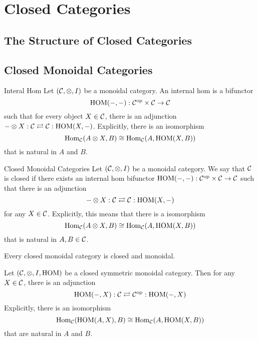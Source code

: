 \documentclass[a4paper]{article}
\begin{document}
\section{Closed Categories}
\subsection{The Structure of Closed Categories}

\subsection{Closed Monoidal Categories}
\begin{defn}{Interal Hom}{} Let $(\mathcal{C},\otimes,I)$ be a monoidal category. An internal hom is a bifunctor $$\text{HOM}(-,-):\mathcal{C}^\text{op}\times\mathcal{C}\to\mathcal{C}$$ such that for every object $X\in\mathcal{C}$, there is an adjunction $-\otimes X:\mathcal{C}\rightleftarrows\mathcal{C}:\text{HOM}(X,-)$. Explicitly, there is an isomorphism $$\operatorname{Hom}_{\mathcal{C}}(A\otimes X,B)\cong\operatorname{Hom}_{\mathcal{C}}(A,\text{HOM}(X,B))$$ that is natural in $A$ and $B$. 
\end{defn}

\begin{defn}{Closed Monoidal Categories}{} Let $(\mathcal{C},\otimes,I)$ be a monoidal category. We say that $\mathcal{C}$ is closed if there exists an internal hom bifunctor $\text{HOM}(-,-):\mathcal{C}^\text{op}\times\mathcal{C}\to\mathcal{C}$ such that there is an adjunction $$-\otimes X:\mathcal{C}\rightleftarrows\mathcal{C}:\text{HOM}(X,-)$$ for any $X\in\mathcal{C}$. Explicitly, this means that there is a isomorphism $$\operatorname{Hom}_{\mathcal{C}}(A\otimes X,B)\cong\operatorname{Hom}_{\mathcal{C}}(A,\text{HOM}(X,B))$$ that is natural in $A,B\in\mathcal{C}$. 
\end{defn}

\begin{prp}{}{} Every closed monoidal category is closed and monoidal. 
\end{prp}

\begin{prp}{}{} Let $(\mathcal{C},\otimes,I,\text{HOM})$ be a closed symmetric monoidal category. Then for any $X\in\mathcal{C}$, there is an adjunction $$\text{HOM}(-,X):\mathcal{C}\rightleftarrows\mathcal{C}^\text{op}:\text{HOM}(-,X)$$ Explicitly, there is an isomorphism $$\operatorname{Hom}_{\mathcal{C}}(\text{HOM}(A,X),B)\cong\operatorname{Hom}_{\mathcal{C}}(A,\text{HOM}(X,B))$$ that are natural in $A$ and $B$. 
\end{prp}
\end{document}
